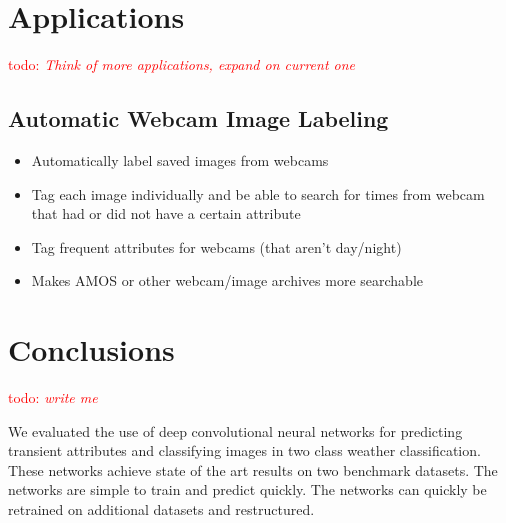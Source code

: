 \documentclass{article}
\newcommand{\todo}[1]{\textcolor{red}{todo: {\em #1}}}
\begin{document}
\section{Applications}
\todo{Think of more applications, expand on current one}
\subsection{Automatic Webcam Image Labeling}

\begin{itemize}

	\item Automatically label saved images from webcams
	\item Tag each image individually and be able to search for times from
			  webcam that had or did not have a certain attribute
	\item Tag frequent attributes for webcams (that aren't day/night)
	\item Makes AMOS or other webcam/image archives more searchable

\end{itemize}


\section{Conclusions}
\todo{write me}

We evaluated the use of deep convolutional neural networks for predicting
transient attributes and classifying images in two class weather 
classification.  These networks achieve state of the art results on two
benchmark datasets.  The networks are simple to train and predict 
quickly.  The networks can quickly be retrained on additional datasets
and restructured.




\end{document}
